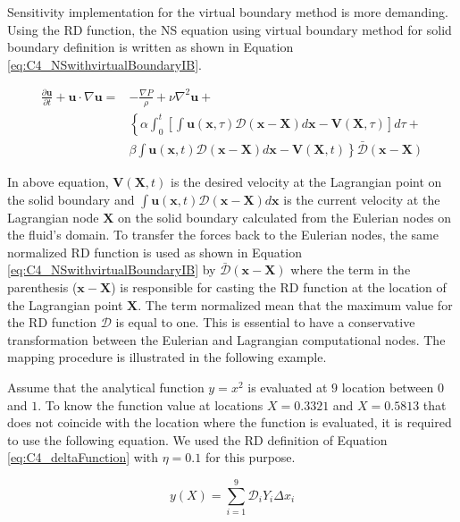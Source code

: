 Sensitivity implementation for the virtual boundary method is more demanding. Using the RD function, the NS equation using virtual boundary method for solid boundary definition is written as shown in Equation \eqref{eq:C4_NSwithvirtualBoundaryIB}.

\begin{align}\label{eq:C4_NSwithvirtualBoundaryIB}
	\frac{\partial \mathbf{u}}{\partial t} + 
	\mathbf{u} \cdot \nabla \mathbf{u} = 
	&-\frac{\nabla P}{\rho} + 
	\nu \nabla^2 \mathbf{u} + \nonumber \\
	&\left\{
	\alpha
	\int_0^t
	\left[
		\int \mathbf{u}(\mathbf{x}, \tau) \mathcal{D}(\mathbf{x} - \mathbf{X}) d\mathbf{x} - \mathbf{V}(\mathbf{X}, \tau)
	\right] d\tau \right.
	+ \nonumber \\
	&
	\left.
	\beta
	\int \mathbf{u}(\mathbf{x}, t) \mathcal{D}(\mathbf{x} - \mathbf{X}) d\mathbf{x} - \mathbf{V}(\mathbf{X}, t)
	\right\} \bar{\mathcal{D}}(\mathbf{x} - \mathbf{X})
\end{align}

In above equation, $\mathbf{V}(\mathbf{X}, t)$ is the desired velocity at the Lagrangian point on the solid boundary and $\int \mathbf{u}(\mathbf{x}, t) \mathcal{D}(\mathbf{x} - \mathbf{X}) d\mathbf{x}$ is the current velocity at the Lagrangian node $\mathbf{X}$ on the solid boundary calculated from the Eulerian nodes on the fluid's domain. To transfer the forces back to the Eulerian nodes, the same normalized RD function is used as shown in Equation \eqref{eq:C4_NSwithvirtualBoundaryIB} by $\bar{\mathcal{D}}(\mathbf{x} - \mathbf{X})$ where the term in the parenthesis ($\mathbf{x} - \mathbf{X}$) is responsible for casting the RD function at the location of the Lagrangian point $\mathbf{X}$. The term normalized mean that the maximum value for the RD function $\mathcal{D}$ is equal to one. This is essential to have a conservative transformation between the Eulerian and Lagrangian computational nodes. The mapping procedure is illustrated in the following example.

Assume that the analytical function $y=x^2$ is evaluated at $9$ location between $0$ and $1$. To know the function value at locations $X = 0.3321$ and $X = 0.5813$ that does not coincide with the location where the function is evaluated, it is required to use the following equation. We used the RD definition of Equation \eqref{eq:C4_deltaFunction} with $\eta = 0.1$ for this purpose.

\begin{equation}\label{eq:C4_euler2lagrange}
	y(X) = \sum_{i=1}^9 \mathcal{D}_i Y_i \Delta x_i
\end{equation}


